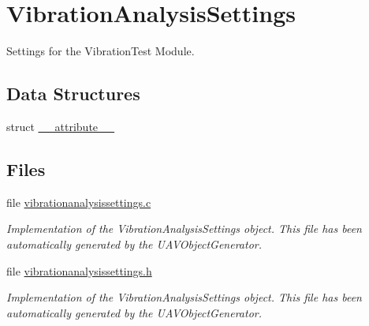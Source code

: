 \hypertarget{group___vibration_analysis_settings}{\section{\-Vibration\-Analysis\-Settings}
\label{group___vibration_analysis_settings}
}


\-Settings for the \-Vibration\-Test \-Module.  


\subsection*{\-Data \-Structures}
\begin{DoxyCompactItemize}
\item 
struct \hyperlink{struct____attribute____}{\-\_\-\-\_\-attribute\-\_\-\-\_\-}
\end{DoxyCompactItemize}
\subsection*{\-Files}
\begin{DoxyCompactItemize}
\item 
file \hyperlink{vibrationanalysissettings_8c}{vibrationanalysissettings.\-c}
\begin{DoxyCompactList}\small\item\em \-Implementation of the \-Vibration\-Analysis\-Settings object. \-This file has been automatically generated by the \-U\-A\-V\-Object\-Generator. \end{DoxyCompactList}\item 
file \hyperlink{vibrationanalysissettings_8h}{vibrationanalysissettings.\-h}
\begin{DoxyCompactList}\small\item\em \-Implementation of the \-Vibration\-Analysis\-Settings object. \-This file has been automatically generated by the \-U\-A\-V\-Object\-Generator. \end{DoxyCompactList}\end{DoxyCompactItemize}
